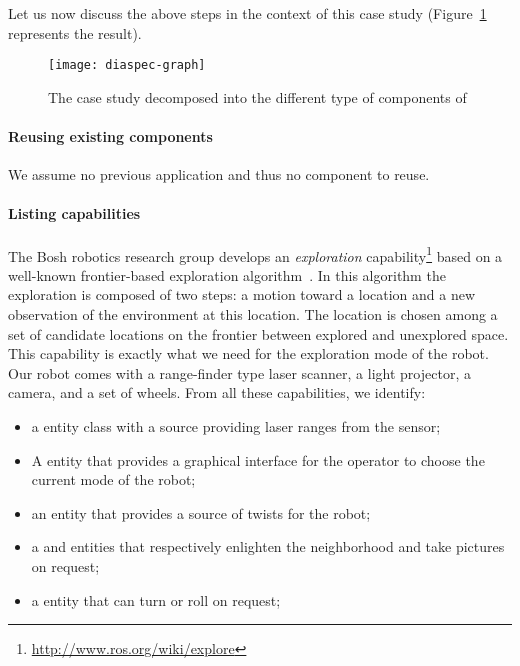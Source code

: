 Let us now discuss the above steps in the context of this case
study (Figure~\ref{fig:diaspec-graph} represents the result).

\begin{figure}
  \centering
  \texttt{[image: diaspec-graph]}
  \caption{The case study decomposed into the different type of
    components of \diaspec{}}
\label{fig:diaspec-graph}
\end{figure}

\paragraph*{Reusing existing components}
We assume no previous \diaspec{} application and thus no \diaspec{}
component to reuse.

\paragraph*{Listing capabilities}
The Bosh robotics research group develops an \emph{exploration}
capability\footnote{\url{http://www.ros.org/wiki/explore}} based on a
well-known frontier-based exploration algorithm~\cite{Yamau98a}. In
this algorithm the exploration is composed of two steps: a motion
toward a location and a new observation of the environment at this
location. The location is chosen among a set of candidate locations on
the frontier between explored and unexplored space. This capability is
exactly what we need for the exploration mode of the robot. Our robot
comes with a range-finder type laser scanner, a light projector, a
camera, and a set of wheels. From all these capabilities, we identify:

\begin{itemize}
\item a  entity class with a  source
  providing laser ranges from the sensor;
\item A  entity that provides a graphical interface
  for the operator to choose the current mode of the robot;
\item an  entity that provides a source of twists for
  the robot;
\item a  and  entities that respectively
  enlighten the neighborhood and take pictures on request;
\item a  entity that can turn or roll on request;
\end{itemize}

